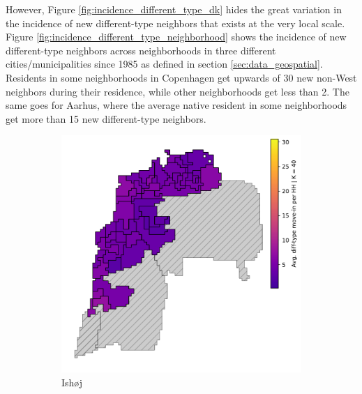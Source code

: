 \documentclass[main.tex]{subfiles}
\begin{document}
However, Figure \ref{fig:incidence_different_type_dk} hides the great variation in the incidence of new different-type neighbors that exists at the very local scale. Figure \ref{fig:incidence_different_type_neighborhood} shows the incidence of new different-type neighbors across neighborhoods in three different cities/municipalities since 1985 as defined in section \ref{sec:data_geospatial}. Residents in some neighborhoods in Copenhagen get upwards of 30 new non-West neighbors during their residence, while other neighborhoods get less than 2. The same goes for Aarhus, where the average native resident in some neighborhoods get more than 15 new different-type neighbors.

\begin{figure}
\centering
\caption{Incidence of new different-type neighbors at the neighborhood level} \label{fig:incidence_different_type_neighborhood}
	\begin{subfigure}{.5\textwidth}	
	\centering
	\includegraphics[width=\textwidth]{figs/ishoj_howdy_neighbor_sample.pdf}	
	\caption{Ishøj} \label{fig:incidence_different_type_ishoj}
	\end{subfigure}
    \begin{subfigure}{.42\textwidth}	
	\centering

\end{subfigure}
\end{figure}
\end{document}
